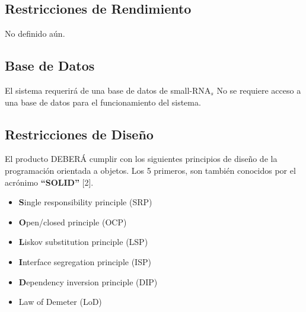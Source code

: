 \documentclass[12pt,a4paper,english,spanish]{article}
\begin{document}
\begin{itemize}


	\end{itemize}


\subsection{Restricciones de Rendimiento}
	 No definido aún.

\subsection{Base de Datos}
El sistema requerirá de una base de datos de small-RNA$_s$
	No se requiere acceso a una base de datos para el funcionamiento del sistema.

\subsection{Restricciones de Diseño}
\par El producto DEBERÁ cumplir con los siguientes principios de diseño de la
programación orientada a objetos. Los 5 primeros, son también conocidos por
el acrónimo \textbf{``SOLID''} [2].
\begin{itemize}
	\item \textbf{S}ingle responsibility principle (SRP)
	\item \textbf{O}pen/closed principle (OCP)
	\item \textbf{L}iskov substitution principle (LSP)
	\item \textbf{I}nterface segregation principle (ISP)
	\item \textbf{D}ependency inversion principle (DIP)	
	\item Law of Demeter (LoD)
\end{itemize}
\end{document}

